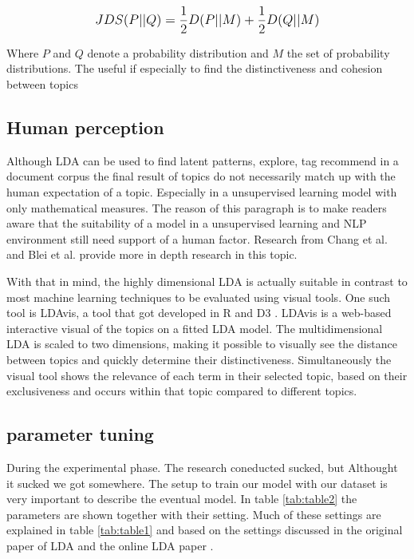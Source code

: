 \[
\mathlarger{JDS(P||Q) = \frac{1}{2}D(P||M) + \frac{1}{2}D(Q||M)}
\]

Where $P$ and $Q$ denote a probability distribution and $M$ the set of probability distributions. The useful if especially to find the distinctiveness and cohesion between topics

\subsection{Human perception}\label{results:humanperception}
Although LDA can be used to find latent patterns, explore, tag recommend in a document corpus the final result of topics do not necessarily match up with the human expectation of a topic. Especially in a unsupervised learning model with only mathematical measures\cite{Towne2016MeasuringPerception}. The reason of this paragraph is to make readers aware that the suitability of a model in a unsupervised learning and NLP environment still need support of a human factor. Research from Chang  et al. \cite{Chang2009ReadingModels} and Blei et al. \cite{Chaney2012VisualizingModels.} provide more in depth research in this topic.  

With that in mind, the highly dimensional LDA is actually suitable in contrast to most machine learning techniques to be evaluated using visual tools. One such tool is LDAvis, a tool that got developed in R and D3 \cite{Sievert2014}. LDAvis is a web-based interactive visual of the topics on a fitted LDA model. The multidimensional LDA is scaled to two dimensions, making it possible to visually see the distance between topics and quickly determine their distinctiveness. Simultaneously the visual tool shows the relevance of each term in their selected topic, based on their exclusiveness and occurs within that topic compared to different topics.

\subsection{parameter tuning}\label{results:parameter tuning}
During the experimental phase. The research coneducted sucked, but Althought it sucked we got somewhere. 
The setup to train our model with our dataset is very important to describe the eventual model. In table \ref{tab:table2} the parameters are shown together with their setting. Much of these settings are explained in table \ref{tab:table1} and based on the settings discussed in the original paper of LDA \cite{Blei2003} and the online LDA paper \cite{Hoffman2010OnlineAllocation}. 

